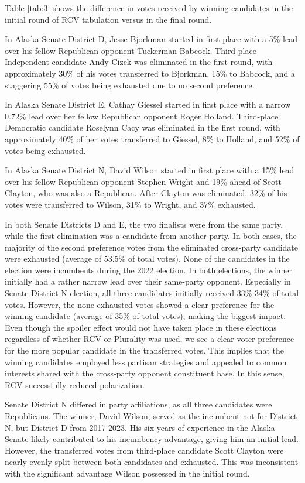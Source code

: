 Table \ref{tab:3} shows the difference in votes received by winning candidates in the initial round of RCV tabulation versus in the final round. 

In Alaska Senate District D, Jesse Bjorkman started in first place with a 5\% lead over his fellow Republican opponent Tuckerman Babcock. Third-place Independent candidate Andy Cizek was eliminated in the first round, with approximately 30\% of his votes transferred to Bjorkman, 15\% to Babcock, and a staggering 55\% of votes being exhausted due to no second preference. 

In Alaska Senate District E, Cathay Giessel started in first place with a narrow 0.72\% lead over her fellow Republican opponent Roger Holland. Third-place Democratic candidate Roselynn Cacy was eliminated in the first round, with approximately 40\% of her votes transferred to Giessel, 8\% to Holland, and 52\% of votes being exhausted. 

In Alaska Senate District N, David Wilson started in first place with a 15\% lead over his fellow Republican opponent Stephen Wright and 19\% ahead of Scott Clayton, who was also a Republican. After Clayton was eliminated, 32\% of his votes were transferred to Wilson, 31\% to Wright, and 37\% exhausted. 

In both Senate Districts D and E, the two finalists were from the same party, while the first elimination was a candidate from another party. In both cases, the majority of the second preference votes from the eliminated cross-party candidate were exhausted (average of 53.5\% of total votes). None of the candidates in the election were incumbents during the 2022 election. In both elections, the winner initially had a rather narrow lead over their same-party opponent. Especially in Senate District N election, all three candidates initially received 33\%-34\% of total votes. However, the none-exhausted votes showed a clear preference for the winning candidate (average of 35\% of total votes), making the biggest impact. Even though the spoiler effect would not have taken place in these elections regardless of whether RCV or Plurality was used, we see a clear voter preference for the more popular candidate in the transferred votes. This implies that the winning candidates employed less partisan strategies and appealed to common interests shared with the cross-party opponent constituent base. In this sense, RCV successfully reduced polarization.

Senate District N differed in party affiliations, as all three candidates were Republicans. The winner, David Wilson, served as the incumbent not for District N, but District D from 2017-2023. His six years of experience in the Alaska Senate likely contributed to his incumbency advantage, giving him an initial lead. However, the transferred votes from third-place candidate Scott Clayton were nearly evenly split between both candidates and exhausted. This was inconsistent with the significant advantage Wilson possessed in the initial round. 

